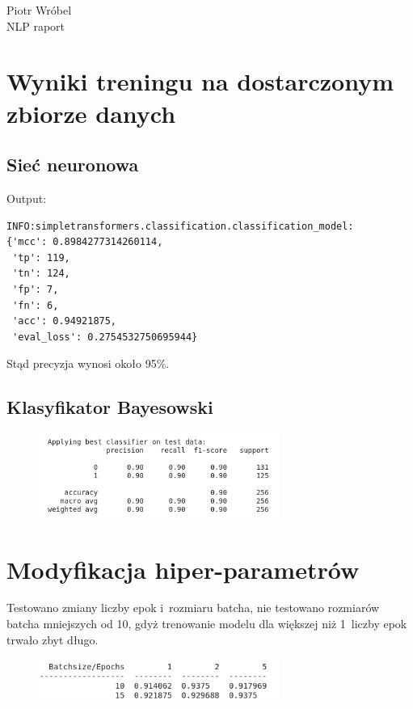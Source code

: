 \documentclass[12pt, a4paper]{mwart}
\begin{document}
\begin{center}
Piotr Wróbel\\
NLP \ppauza raport
\end{center}
  
\section{Wyniki treningu na dostarczonym zbiorze danych}

\subsection{Sieć neuronowa}

Output:
\begin{lstlisting}
INFO:simpletransformers.classification.classification_model:
{'mcc': 0.8984277314260114, 
 'tp': 119, 
 'tn': 124, 
 'fp': 7, 
 'fn': 6, 
 'acc': 0.94921875, 
 'eval_loss': 0.2754532750695944}
\end{lstlisting}

Stąd precyzja wynosi około 95\%.

\subsection{Klasyfikator Bayesowski}

\begin{figure}[ht]
  \centering
  \includegraphics[width=0.7\textwidth]{images/bayes.png}
\end{figure}

\section{Modyfikacja hiper-parametrów}

Testowano zmiany liczby epok i~rozmiaru batcha, nie testowano rozmiarów batcha mniejszych od 10, gdyż trenowanie modelu dla większej niż 1~liczby epok trwało zbyt długo.

\begin{figure}[ht]
  \centering
  \includegraphics[width=0.7\textwidth]{images/hyper.png}
\end{figure}
\end{document}
